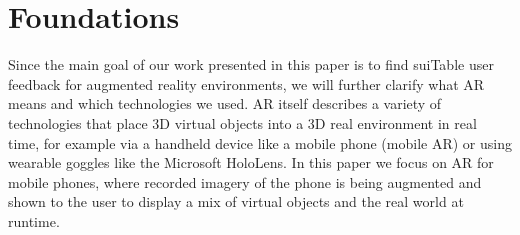 \documentclass[11pt, a4paper]{article}
\begin{document}
	\pagestyle{myheadings}
	\section*{Foundations}\label{sec:foundations}
		Since the main goal of our work presented in this paper is to find suiTable user feedback for augmented reality environments, we will further clarify what \ac{AR} means and which technologies we used. \ac{AR} itself describes a variety of technologies that place 3D virtual objects into a 3D real environment in real time, for example via a handheld device like a mobile phone (mobile \ac{AR}) or using wearable goggles like the Microsoft HoloLens. In this paper we focus on \ac{AR} for mobile phones, where recorded imagery of the phone is being augmented and shown to the user to display a mix of virtual objects and the real world at runtime.
\end{document}
